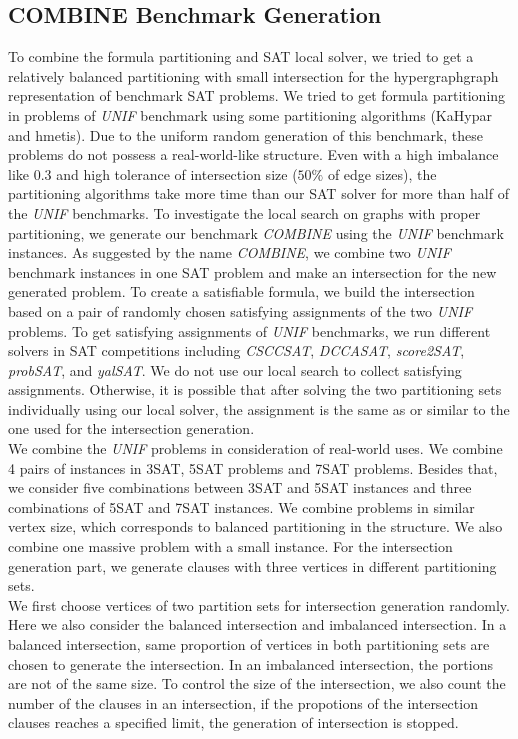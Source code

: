 \documentclass[12pt,a4paper,twoside]{scrartcl}
\numberwithin{equation}{section}
\begin{document}
\subsection{COMBINE Benchmark Generation}
To combine the formula partitioning and SAT local solver, we tried to get a relatively balanced partitioning with small intersection for the hypergraphgraph representation of benchmark SAT problems.  We tried to get formula partitioning in problems of \emph{UNIF} benchmark using some partitioning algorithms (KaHypar and hmetis). Due to the uniform random generation of this benchmark, these problems do not possess a real-world-like structure. Even with a high imbalance like $0.3$ and high tolerance of intersection size ($50\%$ of edge sizes), the partitioning algorithms take more time than our SAT solver for more than half of the  \emph{UNIF} benchmarks.  To investigate the local search on graphs with proper partitioning, we generate our benchmark \emph{COMBINE}  using the  \emph{UNIF} benchmark instances.  As suggested by the name \emph{COMBINE}, we combine two \emph{UNIF} benchmark instances in one SAT problem and make an intersection for the new generated problem.  To create a satisfiable formula, we build the intersection based on a pair of randomly chosen satisfying assignments of the two \emph{UNIF} problems. To get satisfying assignments of  \emph{UNIF} benchmarks, we run different solvers in SAT competitions including \emph{CSCCSAT}, \emph{DCCASAT}, \emph{score2SAT}, \emph{probSAT}, and \emph{yalSAT}. We do not use our local search to collect satisfying assignments. Otherwise, it is possible that after solving the two partitioning sets individually using our local solver, the assignment is the same as or similar to the one used for the intersection generation.\\
We combine the \emph{UNIF} problems in consideration of real-world uses. 
We combine 4 pairs of instances in  3SAT, 5SAT problems and 7SAT problems. Besides that, we consider five combinations between  3SAT and 5SAT instances and three combinations of 5SAT and 7SAT instances. 
We combine problems in similar vertex size, which corresponds to balanced partitioning in the structure. We also combine one massive problem with a small instance. For the intersection generation part, we generate clauses with three vertices in different partitioning sets. \\
We first choose vertices of two partition sets for intersection generation randomly. Here we also consider the balanced intersection and imbalanced intersection. In a balanced intersection, same proportion of vertices in both partitioning sets are chosen to generate the intersection. In an imbalanced intersection, the portions are not of the same size.  To control the size of the intersection, we also count the number of the clauses in an intersection, if the propotions of the intersection clauses reaches a specified limit, the generation of intersection is stopped.\\
\end{document}
